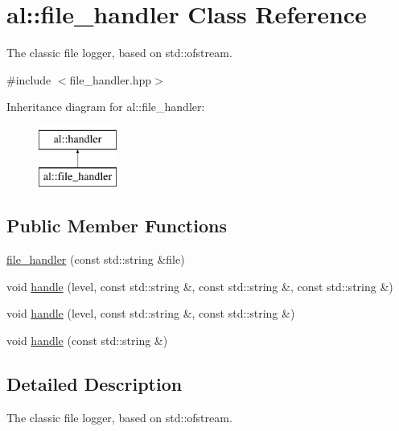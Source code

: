 \hypertarget{classal_1_1file__handler}{\section{al\-:\-:file\-\_\-handler \-Class \-Reference}
\label{classal_1_1file__handler}
}


\-The classic file logger, based on std\-::ofstream.  




{\ttfamily \#include $<$file\-\_\-handler.\-hpp$>$}

\-Inheritance diagram for al\-:\-:file\-\_\-handler\-:\begin{figure}[H]
\begin{center}
\leavevmode
\includegraphics[height=2.000000cm]{classal_1_1file__handler}
\end{center}
\end{figure}
\subsection*{\-Public \-Member \-Functions}
\begin{DoxyCompactItemize}
\item 
\hyperlink{classal_1_1file__handler_a77f69cc57230734c01c160989c0e3664}{file\-\_\-handler} (const std\-::string \&file)
\item 
void \hyperlink{classal_1_1file__handler_a1376091820f51db3ef0423b0e39a9680}{handle} (level, const std\-::string \&, const std\-::string \&, const std\-::string \&)
\item 
void \hyperlink{classal_1_1file__handler_a5de57304a22107e403c1ac917001da38}{handle} (level, const std\-::string \&, const std\-::string \&)
\item 
void \hyperlink{classal_1_1file__handler_a1d02c57ba2bb955c4a2ecf6886b96756}{handle} (const std\-::string \&)
\end{DoxyCompactItemize}


\subsection{\-Detailed \-Description}
\-The classic file logger, based on std\-::ofstream. 

